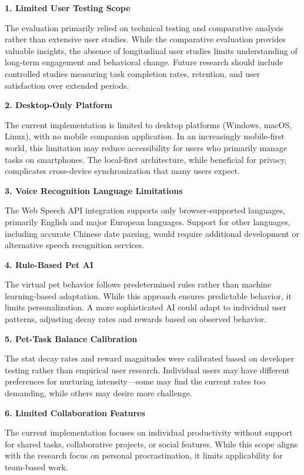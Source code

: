 \textbf{1. Limited User Testing Scope}

The evaluation primarily relied on technical testing and comparative analysis rather than extensive user studies. While the comparative evaluation provides valuable insights, the absence of longitudinal user studies limits understanding of long-term engagement and behavioral change. Future research should include controlled studies measuring task completion rates, retention, and user satisfaction over extended periods.

\textbf{2. Desktop-Only Platform}

The current implementation is limited to desktop platforms (Windows, macOS, Linux), with no mobile companion application. In an increasingly mobile-first world, this limitation may reduce accessibility for users who primarily manage tasks on smartphones. The local-first architecture, while beneficial for privacy, complicates cross-device synchronization that many users expect.

\textbf{3. Voice Recognition Language Limitations}

The Web Speech API integration supports only browser-supported languages, primarily English and major European languages. Support for other languages, including accurate Chinese date parsing, would require additional development or alternative speech recognition services.

\textbf{4. Rule-Based Pet AI}

The virtual pet behavior follows predetermined rules rather than machine learning-based adaptation. While this approach ensures predictable behavior, it limits personalization. A more sophisticated AI could adapt to individual user patterns, adjusting decay rates and rewards based on observed behavior.

\textbf{5. Pet-Task Balance Calibration}

The stat decay rates and reward magnitudes were calibrated based on developer testing rather than empirical user research. Individual users may have different preferences for nurturing intensity---some may find the current rates too demanding, while others may desire more challenge.

\textbf{6. Limited Collaboration Features}

The current implementation focuses on individual productivity without support for shared tasks, collaborative projects, or social features. While this scope aligns with the research focus on personal procrastination, it limits applicability for team-based work.

